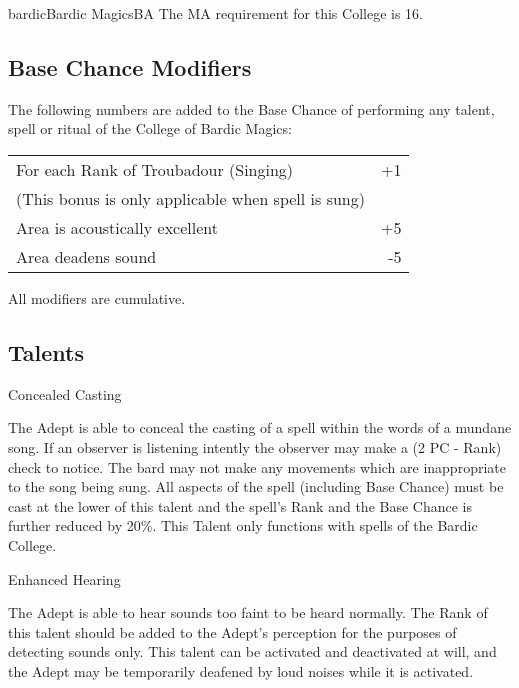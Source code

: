 \begin{college}[2.1]{bardic}{Bardic Magics}{BA}
The MA requirement for this College is 16.

\subsection{Base Chance Modifiers}

The following numbers are added to the Base Chance of performing any
talent, spell or ritual of the College of Bardic Magics:

\begin{tabularx}{\linewidth}{Xr}
For each Rank of Troubadour (Singing)	&	+1 \\
(This bonus is only applicable when spell is sung)\\
Area is acoustically excellent		&	+5 \\
Area deadens sound			&	-5 \\
\end{tabularx}

All modifiers are cumulative. 

\subsection{Talents}

\begin{talent}[T-1]{Concealed Casting}

\begin{effects}
The Adept is able to conceal the casting of a spell within the words
of a mundane song. If an observer is listening intently the observer
may make a (2 \x PC - Rank) check to notice. The bard may not make any
movements which are inappropriate to the song being sung.  All aspects
of the spell (including Base Chance) must be cast at the lower of this
talent and the spell's Rank and the Base Chance is further reduced by
20\%.  This Talent only functions with spells of the Bardic College.
\end{effects}
\end{talent}

\begin{talent}[T-2]{Enhanced Hearing}

\begin{effects}
The Adept is able to hear sounds too faint to be heard normally.  The
Rank of this talent should be added to the Adept's perception for the
purposes of detecting sounds only. This talent can be activated and
deactivated at will, and the Adept may be temporarily deafened by loud
noises while it is activated.
\end{effects}
\end{talent}


\end{college}

